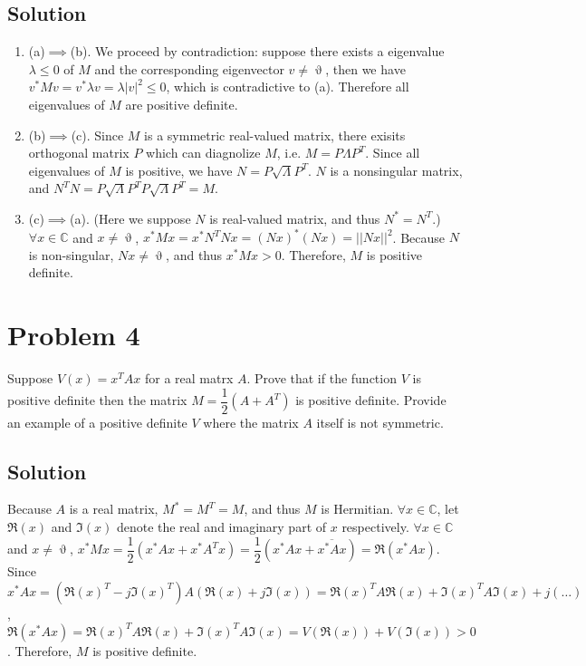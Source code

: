 \documentclass[11pt]{report}
\theoremstyle{definition}
\newcommand{\xlr}[2]{#1 \left(#2\right)}
\begin{document}
\subsection*{Solution}
\begin{enumerate}[.]
\item
(a)$\implies$(b). We proceed by contradiction: suppose there exists a eigenvalue $\lambda \leq 0$ of $M$ and the corresponding eigenvector $v \neq \upvartheta$, then we have $v^* M v = v^* \lambda v = \lambda |v|^2 \leq 0$, which is contradictive to (a). Therefore all eigenvalues of $M$ are positive definite.
\item
(b)$\implies$(c). Since $M$ is a symmetric real-valued matrix, there exisits orthogonal matrix $P$ which can diagnolize $M$, i.e. $M = P \Lambda P^T$. Since all eigenvalues of $M$ is positive, we have $N = P \sqrt{\Lambda} P^T$. $N$ is a nonsingular matrix, and $N^T N = P \sqrt{\Lambda} P^T P \sqrt{\Lambda} P^T = M$.
\item
(c)$\implies$(a). (Here we suppose $N$ is real-valued matrix, and thus $N^* = N^T$.) $\forall x \in \mathbb{C}$ and $x \neq \upvartheta$, $x^* M x = x^* N^T N x = (Nx)^*(Nx) = ||Nx||^2$. Because $N$ is non-singular, $Nx \neq \upvartheta$, and thus $x^* M x > 0$. Therefore, $M$ is positive definite.
\end{enumerate}

\section*{Problem 4}
Suppose $\xlr{V}{x} = x^T A x $ for a real matrx $A$. Prove that if the function $V$ is positive definite then the matrix $M = \dfrac{1}{2} \xlr{}{A + A^T} $ is positive definite. Provide an example of a positive definite $V$ where the matrix $A$ itself is not symmetric.

\subsection*{Solution}
Because $A$ is a real matrix, $M^* = M^T = M$, and thus $M$ is Hermitian. $\forall x \in \mathbb{C}$, let $\Re(x)$ and $\Im(x)$ denote the real and imaginary part of $x$ respectively. $\forall x \in \mathbb{C}$ and $x \neq \upvartheta$, $x^* M x = \dfrac{1}{2} (x^* A x + x^* A^T x) = \dfrac{1}{2} (x^* A x + \overline{x^* A x}) = \Re(x^* A x)$. Since $x^* A x = (\Re(x)^T-j\Im(x)^T) A (\Re(x)+j\Im(x)) = \Re(x)^T A \Re(x) + \Im(x)^T A \Im(x) + j(\ldots)$, $\Re(x^* A x) = \Re(x)^T A \Re(x) + \Im(x)^T A \Im(x) = \xlr{V}{\Re(x)} + \xlr{V}{\Im(x)} > 0$. Therefore, $M$ is positive definite.
\end{document}
